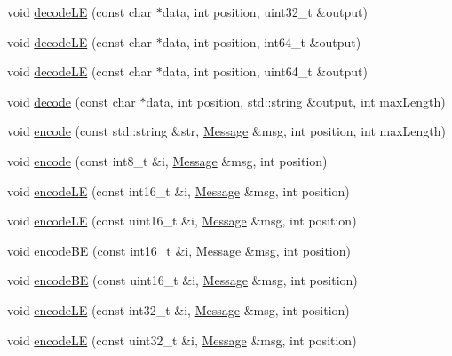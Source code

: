 \begin{DoxyCompactItemize}
\item 
void \hyperlink{classMetal_1_1Codec_aa698a26f90f1f2874183c7b7c90c7b61}{decode\+L\+E} (const char $\ast$data, int position, uint32\+\_\+t \&output)
\item 
void \hyperlink{classMetal_1_1Codec_a1836678a806c987d7d96587a5130b3c6}{decode\+L\+E} (const char $\ast$data, int position, int64\+\_\+t \&output)
\item 
void \hyperlink{classMetal_1_1Codec_ae69549741e857cce3b915c9ef6ab6a7b}{decode\+L\+E} (const char $\ast$data, int position, uint64\+\_\+t \&output)
\item 
void \hyperlink{classMetal_1_1Codec_a22284aa82f334f7e81755dc044e05c58}{decode} (const char $\ast$data, int position, std\+::string \&output, int max\+Length)
\item 
void \hyperlink{classMetal_1_1Codec_aa6be9650e0fc53f01f1c94a771300665}{encode} (const std\+::string \&str, \hyperlink{classMetal_1_1Message}{Message} \&msg, int position, int max\+Length)
\item 
void \hyperlink{classMetal_1_1Codec_a2483a02d8022a4aae4345758244a154b}{encode} (const int8\+\_\+t \&i, \hyperlink{classMetal_1_1Message}{Message} \&msg, int position)
\item 
void \hyperlink{classMetal_1_1Codec_a638c8eccf2d989ea31a0670764b9cb0b}{encode\+L\+E} (const int16\+\_\+t \&i, \hyperlink{classMetal_1_1Message}{Message} \&msg, int position)
\item 
void \hyperlink{classMetal_1_1Codec_a08aafff1f98ec3d4b3c0490606d109f6}{encode\+L\+E} (const uint16\+\_\+t \&i, \hyperlink{classMetal_1_1Message}{Message} \&msg, int position)
\item 
void \hyperlink{classMetal_1_1Codec_a0c3cf0c6a614610c1d56859ea3fadc48}{encode\+B\+E} (const int16\+\_\+t \&i, \hyperlink{classMetal_1_1Message}{Message} \&msg, int position)
\item 
void \hyperlink{classMetal_1_1Codec_a188c8fdc0fb07affe85c8141a5314017}{encode\+B\+E} (const uint16\+\_\+t \&i, \hyperlink{classMetal_1_1Message}{Message} \&msg, int position)
\item 
void \hyperlink{classMetal_1_1Codec_a312401c93d9fdc7ec9468e87534c2f90}{encode\+L\+E} (const int32\+\_\+t \&i, \hyperlink{classMetal_1_1Message}{Message} \&msg, int position)
\item 
void \hyperlink{classMetal_1_1Codec_a5713bcd5042c5ded9e71a336f0ad42bf}{encode\+L\+E} (const uint32\+\_\+t \&i, \hyperlink{classMetal_1_1Message}{Message} \&msg, int position)
\item 

\end{DoxyCompactItemize}

